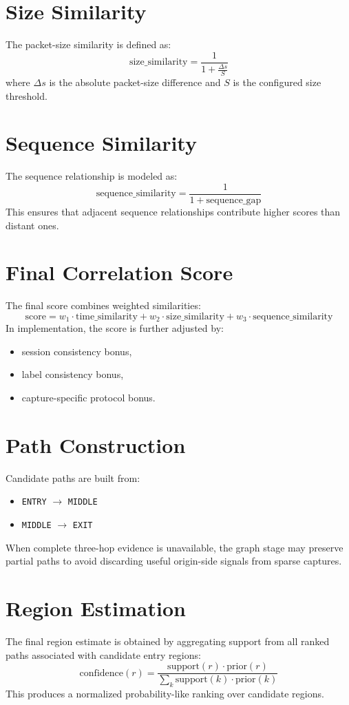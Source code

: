 \documentclass[12pt,a4paper]{report}
\begin{document}
\section{Size Similarity}
The packet-size similarity is defined as:
\[
\text{size\_similarity} = \frac{1}{1 + \frac{\Delta s}{S}}
\]
where $\Delta s$ is the absolute packet-size difference and $S$ is the configured size threshold.

\section{Sequence Similarity}
The sequence relationship is modeled as:
\[
\text{sequence\_similarity} = \frac{1}{1 + \text{sequence\_gap}}
\]
This ensures that adjacent sequence relationships contribute higher scores than distant ones.

\section{Final Correlation Score}
The final score combines weighted similarities:
\[
\text{score} = w_1 \cdot \text{time\_similarity} + w_2 \cdot \text{size\_similarity} + w_3 \cdot \text{sequence\_similarity}
\]
In implementation, the score is further adjusted by:
\begin{itemize}[leftmargin=1.5em]
    \item session consistency bonus,
    \item label consistency bonus,
    \item capture-specific protocol bonus.
\end{itemize}

\section{Path Construction}
Candidate paths are built from:
\begin{itemize}[leftmargin=1.5em]
    \item \texttt{ENTRY} $\rightarrow$ \texttt{MIDDLE}
    \item \texttt{MIDDLE} $\rightarrow$ \texttt{EXIT}
\end{itemize}
When complete three-hop evidence is unavailable, the graph stage may preserve partial paths to avoid discarding useful origin-side signals from sparse captures.

\section{Region Estimation}
The final region estimate is obtained by aggregating support from all ranked paths associated with candidate entry regions:
\[
\text{confidence}(r) = \frac{\text{support}(r) \cdot \text{prior}(r)}{\sum_{k} \text{support}(k) \cdot \text{prior}(k)}
\]
This produces a normalized probability-like ranking over candidate regions.
\end{document}
